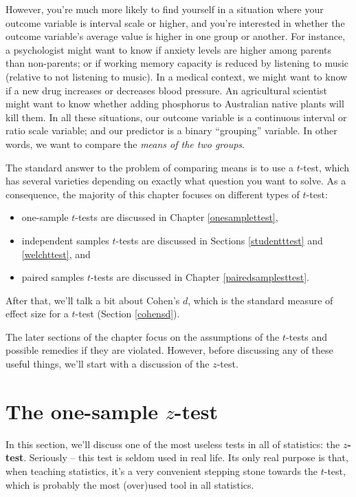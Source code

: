 \documentclass[
]{book}
\providecommand{\tightlist}{%
  \setlength{\itemsep}{0pt}\setlength{\parskip}{0pt}}
\theoremstyle{definition}
\theoremstyle{definition}
\theoremstyle{definition}
\theoremstyle{definition}
\theoremstyle{remark}
\begin{document}
However, you're much more likely to find yourself in a situation where your outcome variable is interval scale or higher, and you're interested in whether the outcome variable's average value is higher in one group or another. For instance, a psychologist might want to know if anxiety levels are higher among parents than non-parents; or if working memory capacity is reduced by listening to music (relative to not listening to music). In a medical context, we might want to know if a new drug increases or decreases blood pressure. An agricultural scientist might want to know whether adding phosphorus to Australian native plants will kill them. In all these situations, our outcome variable is a continuous interval or ratio scale variable; and our predictor is a binary ``grouping'' variable. In other words, we want to compare the \emph{means of the two groups}.

The standard answer to the problem of comparing means is to use a \(t\)-test, which has several varieties depending on exactly what question you want to solve. As a consequence, the majority of this chapter focuses on different types of \(t\)-test:

\begin{itemize}
\tightlist
\item
  one-sample \(t\)-tests are discussed in Chapter \ref{onesamplettest},
\item
  independent samples \(t\)-tests are discussed in Sections \ref{studentttest} and \ref{welchttest}, and
\item
  paired samples \(t\)-tests are discussed in Chapter \ref{pairedsamplesttest}.
\end{itemize}

After that, we'll talk a bit about Cohen's \(d\), which is the standard measure of effect size for a \(t\)-test (Section \ref{cohensd}).

The later sections of the chapter focus on the assumptions of the \(t\)-tests and possible remedies if they are violated. However, before discussing any of these useful things, we'll start with a discussion of the \(z\)-test.

\hypertarget{ztest}{%
\section{\texorpdfstring{The one-sample \(z\)-test}{The one-sample z-test}}\label{ztest}}

In this section, we'll discuss one of the most useless tests in all of statistics: the \textbf{\(z\)-test}. Seriously -- this test is seldom used in real life. Its only real purpose is that, when teaching statistics, it's a very convenient stepping stone towards the \(t\)-test, which is probably the most (over)used tool in all statistics.
\end{document}
